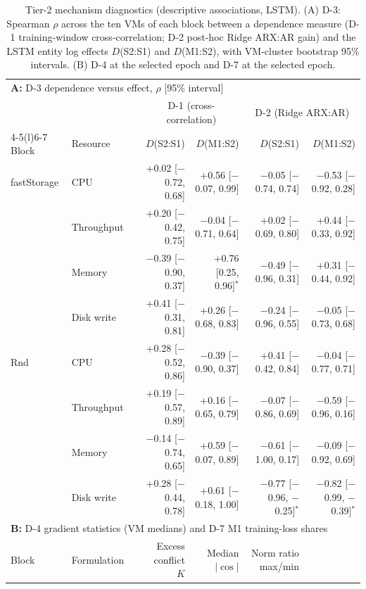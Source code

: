 \documentclass[a4paper,11pt]{article}
\begin{document}
\begin{table}[t]\let\small\footnotesize
  \caption{Tier-2 mechanism diagnostics (descriptive associations, LSTM). (A) D-3: Spearman $\rho$ across the ten VMs of each block between a dependence measure (D-1 training-window cross-correlation; D-2 post-hoc Ridge ARX:AR gain) and the LSTM entity log effects $D$(S2:S1) and $D$(M1:S2), with VM-cluster bootstrap 95\% intervals. (B) D-4 at the selected epoch and D-7 at the selected epoch.}
  \label{tab:tier2-diagnostics}
  \centering
  \small
  \setlength{\tabcolsep}{3pt}
  \begin{tabular*}{\textwidth}{@{\extracolsep{\fill}}lllrrrr@{}}
    \toprule
    \multicolumn{7}{l}{\textbf{A:} D-3 dependence versus effect, $\rho$ [95\% interval]} \\
    & & & \multicolumn{2}{c}{D-1 (cross-correlation)} & \multicolumn{2}{c}{D-2 (Ridge ARX:AR)} \\
    \cmidrule(lr){4-5}\cmidrule(l){6-7}
    Block & Resource & & $D$(S2:S1) & $D$(M1:S2) & $D$(S2:S1) & $D$(M1:S2) \\
    \midrule
    fastStorage & CPU & & +0.02 [$-$0.72, 0.68] & +0.56 [$-$0.07, 0.99] & $-$0.05 [$-$0.74, 0.74] & $-$0.53 [$-$0.92, 0.28] \\
     & Throughput & & +0.20 [$-$0.42, 0.75] & $-$0.04 [$-$0.71, 0.64] & +0.02 [$-$0.69, 0.80] & +0.44 [$-$0.33, 0.92] \\
     & Memory & & $-$0.39 [$-$0.90, 0.37] & +0.76 [0.25, 0.96]$^{*}$ & $-$0.49 [$-$0.96, 0.31] & +0.31 [$-$0.44, 0.92] \\
     & Disk write & & +0.41 [$-$0.31, 0.81] & +0.26 [$-$0.68, 0.83] & $-$0.24 [$-$0.96, 0.55] & $-$0.05 [$-$0.73, 0.68] \\
    Rnd & CPU & & +0.28 [$-$0.52, 0.86] & $-$0.39 [$-$0.90, 0.37] & +0.41 [$-$0.42, 0.84] & $-$0.04 [$-$0.77, 0.71] \\
     & Throughput & & +0.19 [$-$0.57, 0.89] & +0.16 [$-$0.65, 0.79] & $-$0.07 [$-$0.86, 0.69] & $-$0.59 [$-$0.96, 0.16] \\
     & Memory & & $-$0.14 [$-$0.74, 0.65] & +0.59 [$-$0.07, 0.89] & $-$0.61 [$-$1.00, 0.17] & $-$0.09 [$-$0.92, 0.69] \\
     & Disk write & & +0.28 [$-$0.44, 0.78] & +0.61 [$-$0.18, 1.00] & $-$0.77 [$-$0.96, $-$0.25]$^{*}$ & $-$0.82 [$-$0.99, $-$0.39]$^{*}$ \\
    \midrule
    \multicolumn{7}{l}{\textbf{B:} D-4 gradient statistics (VM medians) and D-7 M1 training-loss shares} \\
    Block & Formulation & & Excess conflict $K$ & Median $|\cos|$ & Norm ratio max/min & \\

\end{tabular*}
\end{table}
\end{document}
